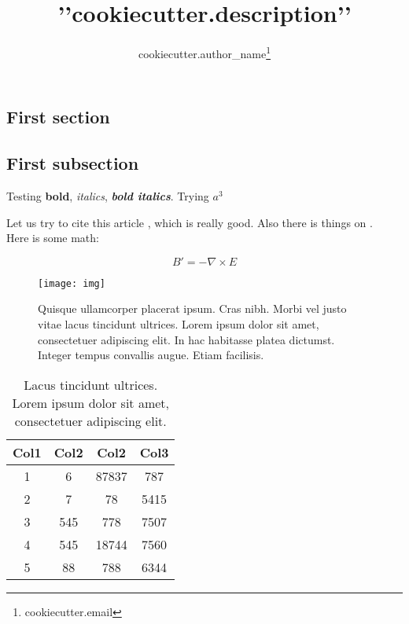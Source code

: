 \documentclass[fontsize=9pt]{scrartcl}
\title{{'{'}}{{cookiecutter.description}}{{'}'}}
\author[1]{ {{cookiecutter.author_name}}\thanks{ {{cookiecutter.email}} } }
\affil[1]{School of things, University of stuff, City XXXXX, Country}
\begin{document}
\maketitle

\begin{abstract}
\lipsum[1]
\end{abstract}

\begin{multicols}{2}


\lipsum[2]

\section{First section}


\subsection{First subsection}

Testing \textbf{bold}, \textit{italics}, \textit{\textbf{bold italics}}.
Trying $a^3$

\lipsum
Let us try to cite this article \cite{knuth:ct:a}, which is really good. Also
there is things on . \\
Here is some math:

\begin{equation}
B'=-\nabla \times E
\end{equation}


\begin{figure}[H]
  \texttt{[image: img]}
  \caption{Quisque ullamcorper placerat ipsum. Cras nibh. Morbi
vel justo vitae lacus tincidunt ultrices. Lorem ipsum dolor
 sit amet, consectetuer adipiscing elit. In hac habitasse
platea dictumst. Integer tempus convallis augue. Etiam facilisis.}
  \label{fig:1}
\end{figure}



\begin{table}[H]
\centering
 \begin{tabular}{||c c c c||}
 \hline
 Col1 & Col2 & Col2 & Col3 \\ [0.5ex]
 \hline\hline
 1 & 6 & 87837 & 787 \\
 2 & 7 & 78 & 5415 \\
 3 & 545 & 778 & 7507 \\
 4 & 545 & 18744 & 7560 \\
 5 & 88 & 788 & 6344 \\ [1ex]
 \hline
 \end{tabular}
 \caption{Lacus tincidunt ultrices. Lorem ipsum dolor
  sit amet, consectetuer adipiscing elit.}
\end{table}



\lipsum[2-6]
\vspace*{1em}

\printbibliography[title=References]
%


\end{multicols}
\end{document}
